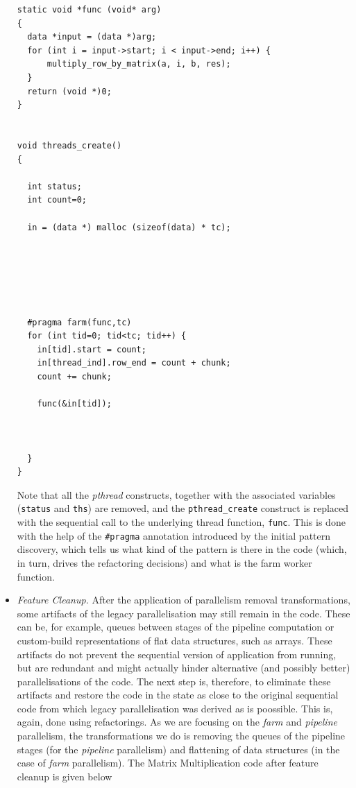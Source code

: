 \begin{itemize}
\begin{lstlisting}
static void *func (void* arg)
{
  data *input = (data *)arg;
  for (int i = input->start; i < input->end; i++) {
	  multiply_row_by_matrix(a, i, b, res);
  }
  return (void *)0;
}


void threads_create()
{

  int status;
  int count=0;
  
  in = (data *) malloc (sizeof(data) * tc);

  




  #pragma farm(func,tc)   
  for (int tid=0; tid<tc; tid++) {  
    in[tid].start = count;
    in[thread_ind].row_end = count + chunk;
    count += chunk;

    func(&in[tid]);



  }
}
\end{lstlisting}

Note that all the \emph{pthread} constructs, together with the associated variables (\lstinline{status} and \lstinline{ths}) are removed, and the \lstinline{pthread_create} construct is replaced with the sequential call to the underlying thread function, \lstinline{func}. This is done with the help of the \lstinline{#pragma} annotation introduced by the initial pattern discovery, which tells us what kind of the pattern is there in the code (which, in turn, drives the refactoring decisions) and what is the farm worker function.

\item \emph{Feature Cleanup.} After the application of parallelism removal transformations, some artifacts of the legacy parallelisation may still remain in the code. These can be, for example, queues between stages of the pipeline computation or custom-build representations of flat data structures, such as arrays. These artifacts do not prevent the sequential version of application from running, but are redundant and might actually hinder alternative (and possibly better) parallelisations of the code. The next step is, therefore, to eliminate these artifacts and restore the code in the state as close to the original sequential code from which legacy parallelisation was derived as is poossible. This is, again, done using refactorings. As we are focusing on the \emph{farm} and \emph{pipeline} parallelism, the transformations we do is removing the queues of the pipeline stages (for the \emph{pipeline} parallelism) and flattening of data structures (in the case of \emph{farm} parallelism). The Matrix Multiplication code after feature cleanup is given below


\end{itemize}
